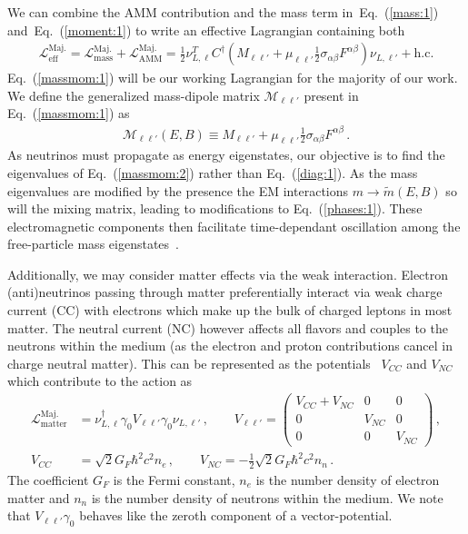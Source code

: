 \documentclass[addchapnum]{ws-rv961x669} %
\newcommand{\req}[1]{Eq.~(\ref{#1})}
\begin{document}
We can combine the AMM contribution and the mass term in~\req{mass:1} and~\req{moment:1} to write an effective Lagrangian containing both
\begin{align}
	\label{massmom:1}
    \mathcal{L}_\mathrm{eff}^\mathrm{Maj.} =
    \mathcal{L}_\mathrm{mass}^\mathrm{Maj.} + \mathcal{L}_\mathrm{AMM}^\mathrm{Maj.} = 
    \frac{1}{2}\nu_{L,\ell}^{T}C^{\dag}\left(M_{\ell\ell'}+\mu_{\ell\ell'}\frac{1}{2}\sigma_{\alpha\beta}F^{\alpha\beta}\right)\nu_{L,\ell'}+\mathrm{h.c.}
\end{align}
\req{massmom:1} will be our working Lagrangian for the majority of our work. We define the generalized mass-dipole matrix $\mathcal{M}_{\ell\ell'}$ present in \req{massmom:1} as
\begin{align}
	\label{massmom:2}
    \mathcal{M}_{\ell\ell'}(E,B)\equiv M_{\ell\ell'}+\mu_{\ell\ell'}\frac{1}{2}\sigma_{\alpha\beta}F^{\alpha\beta}\,.
\end{align}
As neutrinos must propagate as energy eigenstates, our objective is to find the eigenvalues of \req{massmom:2} rather than \req{diag:1}. As the mass eigenvalues are modified by the presence the EM interactions $m\rightarrow\widetilde m(E,B)$ so will the mixing matrix, leading to modifications to \req{phases:1}. These electromagnetic components then facilitate time-dependant oscillation among the free-particle mass eigenstates~\cite{Giunti:2014ixa}.

Additionally, we may consider matter effects via the weak interaction. Electron (anti)neutrinos passing through matter preferentially interact via weak charge current (CC) with electrons which make up the bulk of charged leptons in most matter. The neutral current (NC) however affects all flavors and couples to the neutrons within the medium (as the electron and proton contributions cancel in charge neutral matter). This can be represented as the potentials~\cite{Pal:1991pm,greiner2009gauge} $V_{CC}$ and $V_{NC}$ which contribute to the action as
\begin{align}
    \label{matter:1}
    \mathcal{L}_\mathrm{matter}^\mathrm{Maj.} &= \nu_{L,\ell}^{\dag}\gamma_{0}V_{\ell\ell'}\gamma_{0}\nu_{L,\ell'}\,,\qquad
    V_{\ell\ell'} = 
    \begin{pmatrix}
        V_{CC}+V_{NC} & 0 & 0\\
        0 & V_{NC} & 0\\
        0 & 0 & V_{NC}
    \end{pmatrix}\,,\\
    V_{CC} &= \sqrt{2}G_{F}\hbar^{2}c^{2}n_{e}\,,\qquad V_{NC} = -\frac{1}{2}\sqrt{2}G_{F}\hbar^{2}c^{2}n_{n}\,.
\end{align}
The coefficient $G_{F}$ is the Fermi constant, $n_{e}$ is the number density of electron matter and $n_{n}$ is the number density of neutrons within the medium. We note that $V_{\ell\ell'}\gamma_{0}$ behaves like the zeroth component of a vector-potential.
\end{document}
